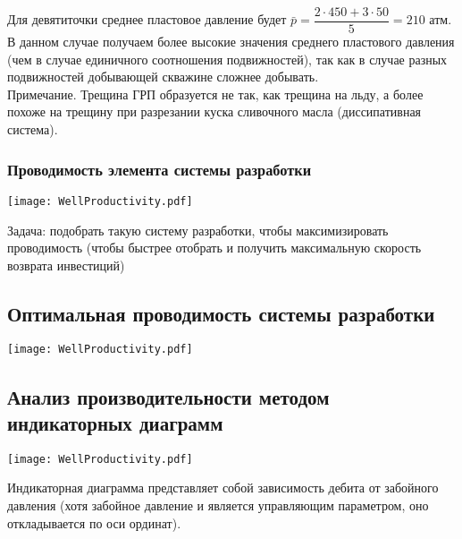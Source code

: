 \documentclass[main.tex]{subfiles}
\begin{document}
Для девятиточки среднее пластовое давление будет $\bar{p}=\dfrac{2\cdot450+3\cdot50}{5}=210$ атм.\\

В данном случае получаем более высокие значения среднего пластового давления (чем в случае единичного соотношения подвижностей), так как в случае разных подвижностей добывающей скважине сложнее добывать.\\

Примечание. Трещина ГРП образуется не так, как трещина на льду, а более похоже на трещину при разрезании куска сливочного масла (диссипативная система).

\subsubsection{Проводимость элемента системы разработки}

\texttt{[image: WellProductivity.pdf]}

Задача: подобрать такую систему разработки, чтобы максимизировать проводимость (чтобы быстрее отобрать и получить максимальную скорость возврата инвестиций)


\subsection{Оптимальная проводимость системы разработки}

\texttt{[image: WellProductivity.pdf]}



\subsection{Анализ производительности методом индикаторных диаграмм}

\texttt{[image: WellProductivity.pdf]}

Индикаторная диаграмма представляет собой зависимость дебита от забойного давления (хотя забойное давление и является управляющим параметром, оно откладывается по оси ординат).
\end{document}
